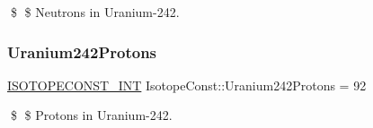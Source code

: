 \$ \$ Neutrons in Uranium-\/242. \mbox{\label{group___isotope_const-_uranium-_u242_ga0091931ad668f2015e63b5a8aaa03d3b}} 
\subsubsection{\texorpdfstring{Uranium242\+Protons}{Uranium242Protons}}
{\footnotesize\ttfamily \mbox{\hyperlink{group___isotope_const-_macros_ga5f18360b3e99483a35c32d789e62621c}{I\+S\+O\+T\+O\+P\+E\+C\+O\+N\+S\+T\+\_\+\+I\+NT}} Isotope\+Const\+::\+Uranium242\+Protons = 92}

\$ \$ Protons in Uranium-\/242. 